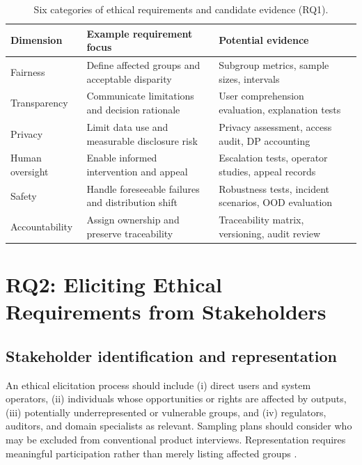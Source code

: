 \documentclass[11pt,a4paper]{article}
\begin{document}
\begin{table}[htbp]
\centering\small
\caption{Six categories of ethical requirements and candidate evidence (RQ1).}\label{tab:taxonomy}
\begin{tabularx}{\linewidth}{p{2.6cm}X X}
\toprule
\textbf{Dimension} & \textbf{Example requirement focus} & \textbf{Potential evidence}\\\midrule
Fairness & Define affected groups and acceptable disparity & Subgroup metrics, sample sizes, intervals\\
Transparency & Communicate limitations and decision rationale & User comprehension evaluation, explanation tests\\
Privacy & Limit data use and measurable disclosure risk & Privacy assessment, access audit, DP accounting\\
Human oversight & Enable informed intervention and appeal & Escalation tests, operator studies, appeal records\\
Safety & Handle foreseeable failures and distribution shift & Robustness tests, incident scenarios, OOD evaluation\\
Accountability & Assign ownership and preserve traceability & Traceability matrix, versioning, audit review\\
\bottomrule
\end{tabularx}
\end{table}

\section{RQ2: Eliciting Ethical Requirements from Stakeholders}
\subsection{Stakeholder identification and representation}
An ethical elicitation process should include (i) direct users and system operators, (ii) individuals whose opportunities or rights are affected by outputs, (iii) potentially underrepresented or vulnerable groups, and (iv) regulators, auditors, and domain specialists as relevant. Sampling plans should consider who may be excluded from conventional product interviews. Representation requires meaningful participation rather than merely listing affected groups \cite{friedman2013}.
\end{document}
